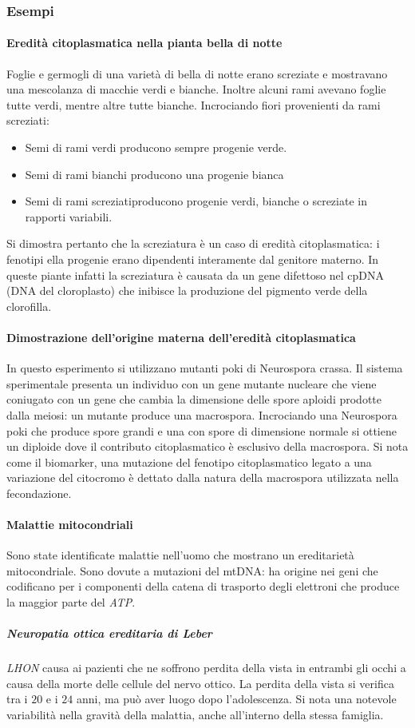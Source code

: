 \subsubsection{Esempi}
\paragraph{Eredit\`a citoplasmatica nella pianta bella di notte}
Foglie e germogli di una variet\`a di bella di notte erano screziate e mostravano una mescolanza di macchie verdi e bianche. Inoltre alcuni rami avevano foglie tutte verdi, mentre altre tutte bianche. 
Incrociando fiori provenienti da rami screziati:
\begin{itemize}
	\item Semi di rami verdi producono sempre progenie verde.
	\item Semi di rami bianchi producono una progenie bianca
	\item Semi di rami screziatiproducono progenie verdi, bianche o screziate in rapporti variabili. 
\end{itemize}
Si dimostra pertanto che la screziatura \`e un caso di eredit\`a citoplasmatica: i fenotipi ella progenie erano dipendenti interamente dal genitore materno. In queste piante infatti la 
screziatura \`e causata da un gene difettoso nel cpDNA (DNA del cloroplasto) che inibisce la produzione del pigmento verde della clorofilla. 
\paragraph{Dimostrazione dell'origine materna dell'eredit\`a citoplasmatica}
In questo esperimento si utilizzano mutanti poki di Neurospora crassa. Il sistema sperimentale presenta un individuo con un gene mutante nucleare che viene coniugato con un gene che cambia la dimensione
delle spore aploidi prodotte dalla meiosi: un mutante produce una macrospora. Incrociando una Neurospora poki che produce spore grandi e una con spore di dimensione normale si ottiene un diploide dove
il contributo citoplasmatico \`e esclusivo della macrospora. Si nota come il biomarker, una mutazione del fenotipo citoplasmatico legato a una variazione del citocromo \`e dettato dalla natura della
macrospora utilizzata nella fecondazione. 
\paragraph{Malattie mitocondriali}
Sono state identificate malattie nell'uomo che mostrano un ereditariet\`a mitocondriale. Sono dovute a mutazioni del mtDNA: ha origine nei geni che codificano per i componenti della catena di trasporto
degli elettroni che produce la maggior parte del \emph{ATP}.
\subparagraph{Neuropatia ottica ereditaria di Leber}
\emph{LHON} causa ai pazienti che ne soffrono perdita della vista in entrambi gli occhi a causa della morte delle cellule del nervo ottico. La perdita della vista si verifica tra i $20$ e i $24$ anni, 
ma pu\`o aver luogo dopo l'adolescenza. Si nota una notevole variabilit\`a nella gravit\`a della malattia, anche all'interno della stessa famiglia.
